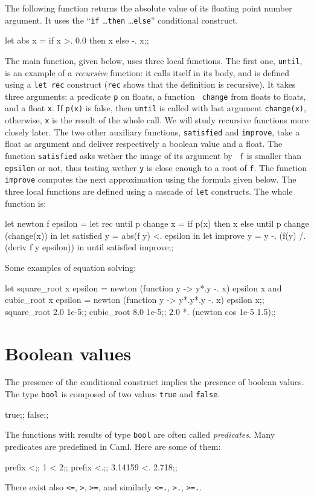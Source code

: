The following function returns the absolute value of its floating
point number argument.  It uses the ``{\tt if} \ldots {\tt then}
\ldots {\tt else}'' conditional construct.
\begin{caml_example}
let abs x = if x >. 0.0 then x else -. x;;
\end{caml_example}
The main function, given below, uses three local functions. The first
one, {\tt until}, is an example of a {\em recursive} function: it
calls itself in its body, and is defined using a {\tt let rec}
construct ({\tt rec} shows that the definition is recursive). It takes
three arguments: a predicate {\tt p} on floats, a function {\tt
change} from floats to floats, and a float {\tt x}. If \verb|p(x)| is
false, then \verb"until" is called with last argument
\verb|change(x)|, otherwise, {\tt x} is the result of the whole call.
We will study recursive functions more closely later. The two other
auxiliary functions, {\tt satisfied} and {\tt improve}, take a float
as argument and deliver respectively a boolean value and a float. The
function {\tt satisfied} asks wether the image of its argument by {\tt
f} is smaller than {\tt epsilon} or not, thus testing wether {\tt y}
is close enough to a root of {\tt f}. The function {\tt improve}
computes the next approximation using the formula given below. The
three local functions are defined using a cascade of {\tt let}
constructs. The whole function is:
\begin{caml_example}
let newton f epsilon =
  let rec until p change x =
            if p(x) then x
            else until p change (change(x)) in
  let satisfied y = abs(f y) <. epsilon in
  let improve y = y -. (f(y) /. (deriv f y epsilon))
in until satisfied improve;;
\end{caml_example}
Some examples of equation solving:
\begin{caml_example}
let square_root x epsilon =
           newton (function y -> y*.y -. x) epsilon x
and cubic_root x epsilon =
           newton (function y -> y*.y*.y -. x) epsilon x;;
square_root 2.0 1e-5;;
cubic_root 8.0 1e-5;;
2.0 *. (newton cos 1e-5 1.5);;
\end{caml_example}

\section{Boolean values}

The presence of the conditional construct implies the presence of
boolean values.  The type \verb"bool" is composed of two values
\verb"true" and \verb"false".
\begin{caml_example}
true;;
false;;
\end{caml_example}
The functions with results of type \verb"bool" are often called {\em
predicates}.
Many predicates are predefined in Caml. Here are some of them:
\begin{caml_example}
prefix <;;
1 < 2;;
prefix <.;;
3.14159 <. 2.718;;
\end{caml_example}
There exist also \verb"<=", \verb">", \verb">=", and similarly
\verb"<=.", \verb">.", \verb">=.".

